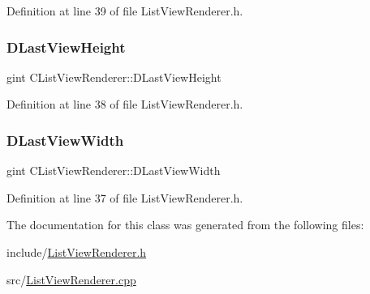 Definition at line 39 of file List\+View\+Renderer.\+h.

\hypertarget{classCListViewRenderer_a7f74a3883638efee557cde501d47ee70}{}\label{classCListViewRenderer_a7f74a3883638efee557cde501d47ee70} 
\subsubsection{\texorpdfstring{D\+Last\+View\+Height}{DLastViewHeight}}
{\footnotesize\ttfamily gint C\+List\+View\+Renderer\+::\+D\+Last\+View\+Height\hspace{0.3cm}{\ttfamily [protected]}}



Definition at line 38 of file List\+View\+Renderer.\+h.

\hypertarget{classCListViewRenderer_ad88d5d0b8209dd9ae1cf726f99339640}{}\label{classCListViewRenderer_ad88d5d0b8209dd9ae1cf726f99339640} 
\subsubsection{\texorpdfstring{D\+Last\+View\+Width}{DLastViewWidth}}
{\footnotesize\ttfamily gint C\+List\+View\+Renderer\+::\+D\+Last\+View\+Width\hspace{0.3cm}{\ttfamily [protected]}}



Definition at line 37 of file List\+View\+Renderer.\+h.



The documentation for this class was generated from the following files\+:\begin{DoxyCompactItemize}
\item 
include/\hyperlink{ListViewRenderer_8h}{List\+View\+Renderer.\+h}\item 
src/\hyperlink{ListViewRenderer_8cpp}{List\+View\+Renderer.\+cpp}\end{DoxyCompactItemize}

